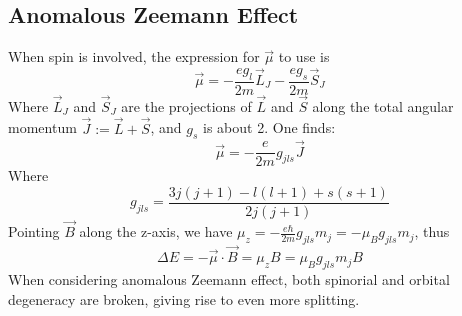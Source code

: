 \documentclass[a4paper,12pt,abstracton]{scrartcl}
\begin{document}
\subsection{Anomalous Zeemann Effect}
When spin is involved, the expression for $\vec{\mu}$ to use is 
\begin{equation}
\vec{\mu}=-\frac{eg_l}{2m} \vec{L}_J - \frac{eg_s}{2m} \vec{S}_J
\end{equation}
Where $\vec{L}_J$ and $ \vec{S}_J$ are the projections of $\vec{L}$ and $\vec{S}$ along the total angular momentum $\vec{J}:= \vec{L}+ \vec{S}$, and $g_s$ is about 2. One finds:
\begin{equation}
\vec{\mu} = -\frac{e}{2m}g_{jls}\vec{J}
\end{equation}
Where 
\begin{equation}
g_{jls}=\frac{3j(j+1)-l(l+1)+s(s+1)}{2j(j+1)}
\end{equation}
Pointing $\vec{B}$ along the z-axis, we have $\mu_z =-\frac{e \hbar}{2m}g_{jls}m_j=-\mu_B g_{jls}m_j$, thus
\begin{equation}
\Delta E = -\vec{\mu}\cdot \vec{B}= \mu_z B = \mu_Bg_{jls}m_j B
\end{equation}
When considering anomalous Zeemann effect, both spinorial and orbital degeneracy are broken, giving rise to even more splitting.


%
%
\end{document}
